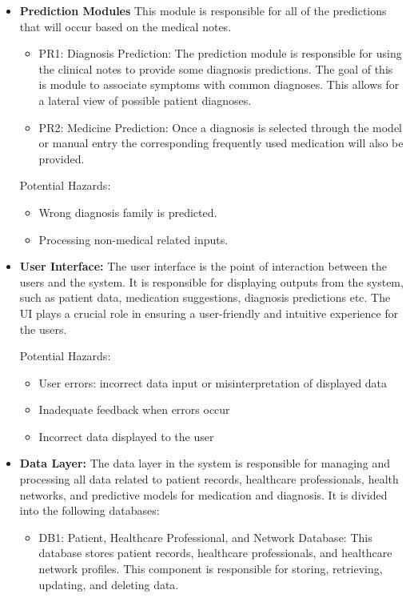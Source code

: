 \documentclass{article}
\begin{document}
\begin{itemize}
    \item \textbf{Prediction Modules}
    This module is responsible for all of the predictions that will occur based on the medical notes.

    \begin{itemize}
        \item PR1: Diagnosis Prediction: The prediction module is responsible for using the clinical notes to provide some diagnosis predictions. The goal of this is module to associate symptoms with common diagnoses. This allows for a lateral view of possible patient diagnoses.
        \item PR2: Medicine Prediction: Once a diagnosis is selected through the model or manual entry the corresponding frequently used medication will also be provided.
    \end{itemize}
    
    Potential Hazards:
    \begin{itemize}
        \item Wrong diagnosis family is predicted.
        \item Processing non-medical related inputs.
    \end{itemize}
 
    \item \textbf{User Interface:}
    The user interface is the point of interaction between the users and the system. It is responsible for displaying outputs from the system, such as patient data, medication suggestions, diagnosis predictions etc. The UI plays a crucial role in ensuring a user-friendly and intuitive experience for the users.
    
    Potential Hazards:
    \begin{itemize}
        \item User errors: incorrect data input or misinterpretation of displayed data
        \item Inadequate feedback when errors occur
        \item Incorrect data displayed to the user
    \end{itemize}

    \item \textbf{Data Layer:}
    The data layer in the system is responsible for managing and processing all data related to patient records, healthcare professionals, health networks, and predictive models for medication and diagnosis. It is divided into the following databases:
    \begin{itemize}
        \item DB1: Patient, Healthcare Professional, and Network Database: This database stores patient records, healthcare professionals, and healthcare network profiles. This component is responsible for storing, retrieving, updating, and deleting data. 


\end{itemize}
\end{itemize}
\end{document}
